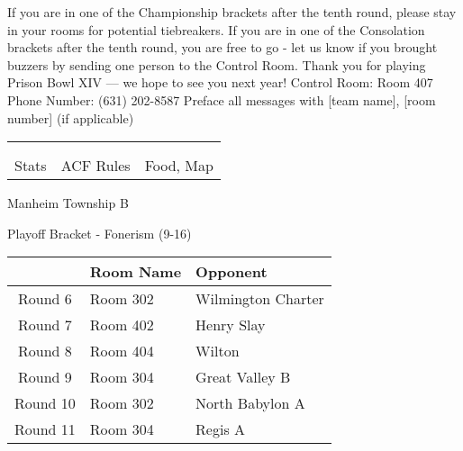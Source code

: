 \documentclass{article}%
\begin{document}
\vspace*{30pt}%
\linebreak%
If you are in one of the Championship brackets after the tenth round, please stay in your rooms for potential tiebreakers.\newline%
\newline%
If you are in one of the Consolation brackets after the tenth round, you are free to go {-} let us know if you brought buzzers by sending one person to the Control Room.\newline%
\newline%
Thank you for playing Prison Bowl XIV — we hope to see you next year!\newline%
\newline%
Control Room: Room 407\newline%
Phone Number: (631) 202{-}8587\newline%
Preface all messages with {[}team name{]}, {[}room number{]} (if applicable)%
\vspace*{30pt}%
\newline%
%
\begin{tabularx}{\textwidth}{YYY}%
  &  &  \\%
\\%
Stats&ACF Rules&Food, Map\\%
\end{tabularx}%
\newpage%
\begin{center}%
\begin{Huge}%
Manheim Township B%
\end{Huge}%
\vspace*{12pt}%
\linebreak%
\begin{Large}%
Playoff Bracket {-} Fonerism (9{-}16)%
\end{Large}%
\end{center}%
\vspace*{4pt}%
%
\begin{tabularx}{\textwidth}{|c|Y|Y|}%
\hline%
&Room Name&Opponent\\%
\hline%
Round 6&Room 302&Wilmington Charter\\%
Round 7&Room 402&Henry Slay\\%
Round 8&Room 404&Wilton\\%
Round 9&Room 304&Great Valley B\\%
Round 10&Room 302&North Babylon A\\%
Round 11&Room 304&Regis A\\%
\hline%
\end{tabularx}%
\end{document}
